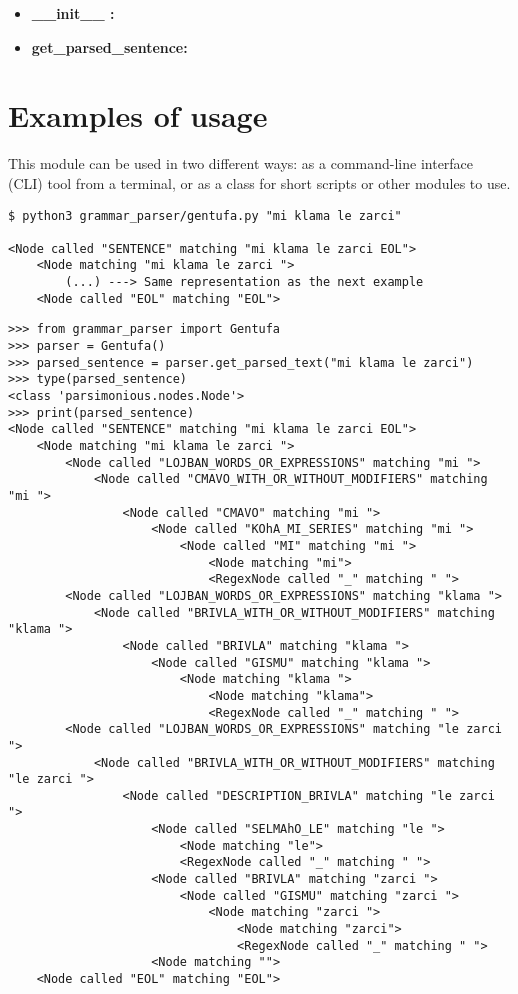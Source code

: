 \begin{itemize}
\item \textbf{\_\_init\_\_ :}
\item \textbf{get\_parsed\_sentence:}
\end{itemize}

\section{Examples of usage}

This module can be used in two different ways: as a command-line interface (CLI) tool
from a terminal, or as a class for short scripts or other modules to use.

\begin{lstlisting}[caption=Gentufa module being used as a command-line interface tool]
$ python3 grammar_parser/gentufa.py "mi klama le zarci"

<Node called "SENTENCE" matching "mi klama le zarci EOL">
    <Node matching "mi klama le zarci ">
        (...) ---> Same representation as the next example
    <Node called "EOL" matching "EOL">
\end{lstlisting}

\begin{lstlisting}[caption=Gentufa class being used by a Python script]
>>> from grammar_parser import Gentufa
>>> parser = Gentufa()
>>> parsed_sentence = parser.get_parsed_text("mi klama le zarci")
>>> type(parsed_sentence)
<class 'parsimonious.nodes.Node'>
>>> print(parsed_sentence)
<Node called "SENTENCE" matching "mi klama le zarci EOL">
    <Node matching "mi klama le zarci ">
        <Node called "LOJBAN_WORDS_OR_EXPRESSIONS" matching "mi ">
            <Node called "CMAVO_WITH_OR_WITHOUT_MODIFIERS" matching "mi ">
                <Node called "CMAVO" matching "mi ">
                    <Node called "KOhA_MI_SERIES" matching "mi ">
                        <Node called "MI" matching "mi ">
                            <Node matching "mi">
                            <RegexNode called "_" matching " ">
        <Node called "LOJBAN_WORDS_OR_EXPRESSIONS" matching "klama ">
            <Node called "BRIVLA_WITH_OR_WITHOUT_MODIFIERS" matching "klama ">
                <Node called "BRIVLA" matching "klama ">
                    <Node called "GISMU" matching "klama ">
                        <Node matching "klama ">
                            <Node matching "klama">
                            <RegexNode called "_" matching " ">
        <Node called "LOJBAN_WORDS_OR_EXPRESSIONS" matching "le zarci ">
            <Node called "BRIVLA_WITH_OR_WITHOUT_MODIFIERS" matching "le zarci ">
                <Node called "DESCRIPTION_BRIVLA" matching "le zarci ">
                    <Node called "SELMAhO_LE" matching "le ">
                        <Node matching "le">
                        <RegexNode called "_" matching " ">
                    <Node called "BRIVLA" matching "zarci ">
                        <Node called "GISMU" matching "zarci ">
                            <Node matching "zarci ">
                                <Node matching "zarci">
                                <RegexNode called "_" matching " ">
                    <Node matching "">
    <Node called "EOL" matching "EOL">
\end{lstlisting}
